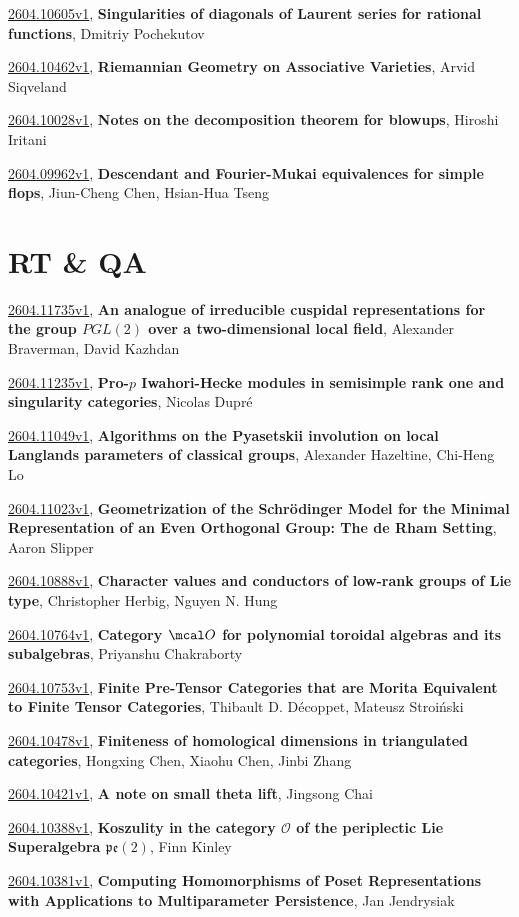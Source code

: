 \documentclass[9pt, a4paper]{article}
\theoremstyle{plain}
\theoremstyle{definition}
\theoremstyle{remark}
\newcommand{\arxiv}[3]{\href{https://arxiv.org/abs/#1}{#1}, \textbf{\textcolor{arxivblue}{#2}}, #3}
\begin{document}
\arxiv{2604.10605v1}{Singularities of diagonals of Laurent series for rational functions}{Dmitriy Pochekutov}

\arxiv{2604.10462v1}{Riemannian Geometry on Associative Varieties}{Arvid Siqveland}

\arxiv{2604.10028v1}{Notes on the decomposition theorem for blowups}{Hiroshi Iritani}

\arxiv{2604.09962v1}{Descendant and Fourier-Mukai equivalences for simple flops}{Jiun-Cheng Chen, Hsian-Hua Tseng}


\section{RT \& QA}
\arxiv{2604.11735v1}{An analogue of irreducible cuspidal representations for the group $PGL(2)$ over a two-dimensional local field}{Alexander Braverman, David Kazhdan}

\arxiv{2604.11235v1}{Pro-$p$ Iwahori-Hecke modules in semisimple rank one and singularity categories}{Nicolas Dupré}

\arxiv{2604.11049v1}{Algorithms on the Pyasetskii involution on local Langlands parameters of classical groups}{Alexander Hazeltine, Chi-Heng Lo}

\arxiv{2604.11023v1}{Geometrization of the Schrödinger Model for the Minimal Representation of an Even Orthogonal Group: The de Rham Setting}{Aaron Slipper}

\arxiv{2604.10888v1}{Character values and conductors of low-rank groups of Lie type}{Christopher Herbig, Nguyen N. Hung}

\arxiv{2604.10764v1}{Category $\mcal O$ for polynomial toroidal algebras and its subalgebras}{Priyanshu Chakraborty}

\arxiv{2604.10753v1}{Finite Pre-Tensor Categories that are Morita Equivalent to Finite Tensor Categories}{Thibault D. Décoppet, Mateusz Stroiński}

\arxiv{2604.10478v1}{Finiteness of homological dimensions in triangulated categories}{Hongxing Chen, Xiaohu Chen, Jinbi Zhang}

\arxiv{2604.10421v1}{A note on small theta lift}{Jingsong Chai}

\arxiv{2604.10388v1}{Koszulity in the category $\mathcal{O}$ of the periplectic Lie Superalgebra $\mathfrak{pe}(2)$}{Finn Kinley}

\arxiv{2604.10381v1}{Computing Homomorphisms of Poset Representations with Applications to Multiparameter Persistence}{Jan Jendrysiak}
\end{document}
